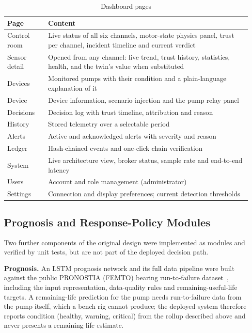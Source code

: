 \begin{table}[htbp]
\centering
\caption{Dashboard pages}
\label{tab:pages}
\small
\begin{tabularx}{\textwidth}{@{}l X@{}}
\toprule
\textbf{Page} & \textbf{Content} \\
\midrule
Control room & Live status of all six channels, motor-state physics panel, trust per channel, incident timeline and current verdict \\
Sensor detail & Opened from any channel: live trend, trust history, statistics, health, and the twin's value when substituted \\
Devices & Monitored pumps with their condition and a plain-language explanation of it \\
Device & Device information, scenario injection and the pump relay panel \\
Decisions & Decision log with trust timeline, attribution and reason \\
History & Stored telemetry over a selectable period \\
Alerts & Active and acknowledged alerts with severity and reason \\
Ledger & Hash-chained events and one-click chain verification \\
System & Live architecture view, broker status, sample rate and end-to-end latency \\
Users & Account and role management (administrator) \\
Settings & Connection and display preferences; current detection thresholds \\
\bottomrule
\end{tabularx}
\end{table}

\subsection{Prognosis and Response-Policy Modules}
\label{sec:impl-prognosis-rl}

Two further components of the original design were implemented as modules and verified by unit tests, but are not part of the deployed decision path.

\textbf{Prognosis.} An LSTM prognosis network and its full data pipeline were built against the public PRONOSTIA (FEMTO) bearing run-to-failure dataset~\cite{nectoux2012pronostia}, including the input representation, data-quality rules and remaining-useful-life targets. A remaining-life prediction for the pump needs run-to-failure data from the pump itself, which a bench rig cannot produce; the deployed system therefore reports condition (healthy, warning, critical) from the rollup described above and never presents a remaining-life estimate.


